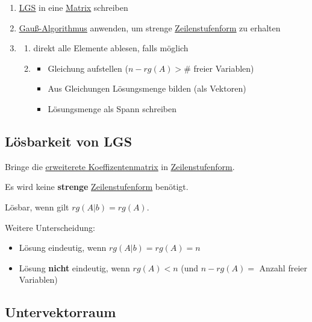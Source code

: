 \documentclass{scrartcl}
\newcommand{\linkTo}[1]{\hyperref[#1]{\underline{#1}}}
\newcommand{\linkToRef}[2][ref]{\hyperref[#1]{\underline{#2}}}
\begin{document}
\begin{enumerate}
\item \linkTo{LGS} in eine \linkTo{Matrix} schreiben
\item \linkToRef[Gauss]{Gauß-Algorithmus} anwenden, um strenge \linkTo{Zeilenstufenform} zu erhalten
\item 
    \begin{enumerate}
        \item direkt alle Elemente ablesen, falls möglich
        \item 
            \begin{itemize}
            \item Gleichung aufstellen ($n-rg(A) > \#$ freier Variablen)
            \item Aus Gleichungen Lösungsmenge bilden (als Vektoren)
            \item Lösungsmenge als Spann schreiben
            \end{itemize}
    \end{enumerate}
\end{enumerate}

\subsection{Lösbarkeit von LGS}

Bringe die \linkTo{erweiterete Koeffizentenmatrix} in \linkTo{Zeilenstufenform}. 

Es wird keine \textbf{strenge} \linkTo{Zeilenstufenform} benötigt.

Lösbar, wenn gilt \linkToRef[Rang]{$rg(A|b) = rg(A)$}.

Weitere Unterscheidung:
\begin{itemize}
\item Lösung eindeutig, wenn $ rg(A|b) = rg(A) = n$
\item Lösung \textbf{nicht} eindeutig, wenn $rg(A) < n$ (und $n - rg(A) = $ Anzahl freier Variablen)
\end{itemize}

\subsection{Untervektorraum}
\end{document}
